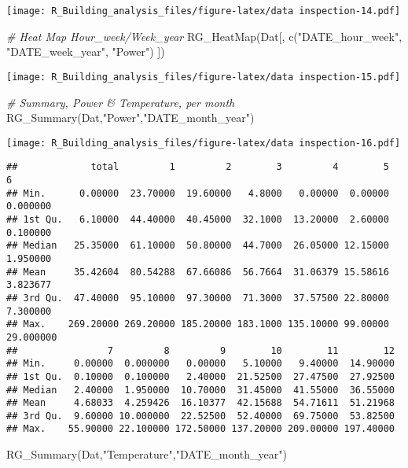 \documentclass[
]{article}
\newenvironment{Shaded}{\begin{snugshade}}{\end{snugshade}}
\newcommand{\CommentTok}[1]{\textcolor[rgb]{0.56,0.35,0.01}{\textit{#1}}}
\newcommand{\FunctionTok}[1]{\textcolor[rgb]{0.00,0.00,0.00}{#1}}
\newcommand{\NormalTok}[1]{#1}
\newcommand{\StringTok}[1]{\textcolor[rgb]{0.31,0.60,0.02}{#1}}
\begin{document}
\texttt{[image: R\_Building\_analysis\_files/figure-latex/data inspection-14.pdf]}

\begin{Shaded}
\begin{Highlighting}[]
  \CommentTok{\# Heat Map Hour\_week/Week\_year}
  \FunctionTok{RG\_HeatMap}\NormalTok{(Dat[,}
                 \FunctionTok{c}\NormalTok{(}\StringTok{"DATE\_hour\_week"}\NormalTok{,}
                   \StringTok{"DATE\_week\_year"}\NormalTok{,}
                   \StringTok{"Power"}\NormalTok{)}
\NormalTok{  ])}
\end{Highlighting}
\end{Shaded}

\texttt{[image: R\_Building\_analysis\_files/figure-latex/data inspection-15.pdf]}

\begin{Shaded}
\begin{Highlighting}[]
  \CommentTok{\# Summary, Power \& Temperature, per month}
  \FunctionTok{RG\_Summary}\NormalTok{(Dat,}\StringTok{"Power"}\NormalTok{,}\StringTok{"DATE\_month\_year"}\NormalTok{)}
\end{Highlighting}
\end{Shaded}

\texttt{[image: R\_Building\_analysis\_files/figure-latex/data inspection-16.pdf]}

\begin{verbatim}
##             total         1         2        3         4        5         6
## Min.      0.00000  23.70000  19.60000   4.8000   0.00000  0.00000  0.000000
## 1st Qu.   6.10000  44.40000  40.45000  32.1000  13.20000  2.60000  0.100000
## Median   25.35000  61.10000  50.80000  44.7000  26.05000 12.15000  1.950000
## Mean     35.42604  80.54288  67.66086  56.7664  31.06379 15.58616  3.823677
## 3rd Qu.  47.40000  95.10000  97.30000  71.3000  37.57500 22.80000  7.300000
## Max.    269.20000 269.20000 185.20000 183.1000 135.10000 99.00000 29.000000
##                7         8         9        10        11        12
## Min.     0.00000  0.000000   0.00000   5.10000   9.40000  14.90000
## 1st Qu.  0.10000  0.100000   2.40000  21.52500  27.47500  27.92500
## Median   2.40000  1.950000  10.70000  31.45000  41.55000  36.55000
## Mean     4.68033  4.259426  16.10377  42.15688  54.71611  51.21968
## 3rd Qu.  9.60000 10.000000  22.52500  52.40000  69.75000  53.82500
## Max.    55.90000 22.100000 172.50000 137.20000 209.00000 197.40000
\end{verbatim}

\begin{Shaded}
\begin{Highlighting}[]
  \FunctionTok{RG\_Summary}\NormalTok{(Dat,}\StringTok{"Temperature"}\NormalTok{,}\StringTok{"DATE\_month\_year"}\NormalTok{)}
\end{Highlighting}
\end{Shaded}
\end{document}
